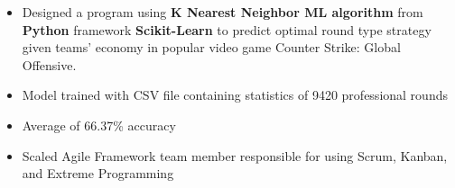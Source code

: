 







\smallskip
\begin{itemize}
\item Designed a program using \textbf{K Nearest Neighbor ML algorithm} from \textbf{Python} framework \textbf{Scikit-Learn} to predict optimal round type strategy given teams' economy in popular video game Counter Strike: Global Offensive.
\smallskip
\item Model trained with CSV file containing statistics of 9420 professional rounds
\smallskip
\item Average of 66.37\% accuracy
\end{itemize}



\divider\smallskip


\divider\smallskip





\begin{itemize}
\item Scaled Agile Framework team member responsible for using Scrum, Kanban, and Extreme Programming
\end{itemize}







\divider

